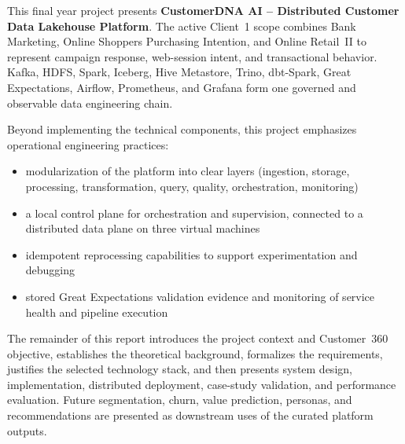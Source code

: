 This final year project presents \textbf{CustomerDNA AI -- Distributed Customer Data Lakehouse Platform}. The active Client~1 scope combines Bank Marketing, Online Shoppers Purchasing Intention, and Online Retail~II to represent campaign response, web-session intent, and transactional behavior. Kafka, HDFS, Spark, Iceberg, Hive Metastore, Trino, dbt-Spark, Great Expectations, Airflow, Prometheus, and Grafana form one governed and observable data engineering chain.

Beyond implementing the technical components, this project emphasizes operational engineering practices:
\begin{itemize}
    \item modularization of the platform into clear layers (ingestion, storage, processing, transformation, query, quality, orchestration, monitoring)
    \item a local control plane for orchestration and supervision, connected to a distributed data plane on three virtual machines
    \item idempotent reprocessing capabilities to support experimentation and debugging
    \item stored Great Expectations validation evidence and monitoring of service health and pipeline execution
\end{itemize}

The remainder of this report introduces the project context and Customer~360 objective, establishes the theoretical background, formalizes the requirements, justifies the selected technology stack, and then presents system design, implementation, distributed deployment, case-study validation, and performance evaluation. Future segmentation, churn, value prediction, personas, and recommendations are presented as downstream uses of the curated platform outputs.